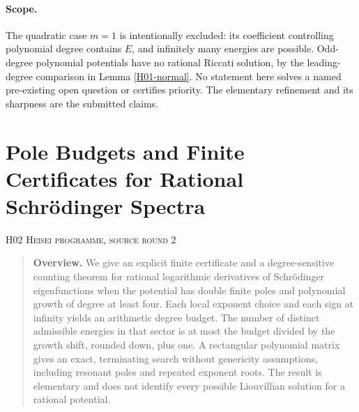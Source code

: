 \documentclass[11pt,a4paper]{article}
\theoremstyle{definition}\newtheorem{definition}[theorem]{Definition}
\theoremstyle{remark}\newtheorem{remark}[theorem]{Remark}
\numberwithin{equation}{section}
\begin{document}
\paragraph{Scope.} The quadratic case $m=1$ is intentionally excluded: its coefficient controlling polynomial degree contains $E$, and infinitely many energies are possible. Odd-degree polynomial potentials have no rational Riccati solution, by the leading-degree comparison in Lemma \ref{H01-normal}. No statement here solves a named pre-existing open question or certifies priority. The elementary refinement and its sharpness are the submitted claims.




\clearpage
\section[H02 --- Pole Budgets and Finite Certificates for Rational Schr\"odinger Spectra]{Pole Budgets and Finite Certificates for Rational Schr\"odinger Spectra}\label{contrib-H02}
\noindent\textsc{H02 \quad Heisei programme, source round 2}\par\medskip






\begin{quote}\small\textbf{Overview.} We give an explicit finite certificate and a degree-sensitive counting theorem for rational logarithmic derivatives of Schr\"odinger eigenfunctions when the potential has double finite poles and polynomial growth of degree at least four. Each local exponent choice and each sign at infinity yields an arithmetic degree budget. The number of distinct admissible energies in that sector is at most the budget divided by the growth shift, rounded down, plus one. A rectangular polynomial matrix gives an exact, terminating search without genericity assumptions, including resonant poles and repeated exponent roots. The result is elementary and does not identify every possible Liouvillian solution for a rational potential.\end{quote}
\end{document}

